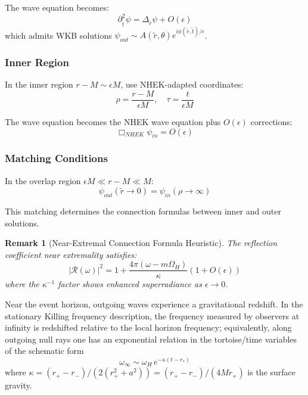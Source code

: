 \documentclass[12pt,a4paper]{article}
\newtheorem{remark}[theorem]{Remark}
\begin{document}
The wave equation becomes:
\begin{equation}
\partial_{\tilde{t}}^2 \psi = \Delta_{\tilde{r}}\psi + O(\epsilon)
\end{equation}
which admits WKB solutions $\psi_{out} \sim A(\tilde{r}, \theta)e^{i\phi(\tilde{r}, \tilde{t})/\epsilon}$.

\subsubsection{Inner Region}

In the inner region $r - M \sim \epsilon M$, use NHEK-adapted coordinates:
\begin{equation}
\rho = \frac{r - M}{\epsilon M}, \quad \tau = \frac{t}{\epsilon M}
\end{equation}

The wave equation becomes the NHEK wave equation plus $O(\epsilon)$ corrections:
\begin{equation}
\Box_{NHEK}\psi_{in} = O(\epsilon)
\end{equation}

\subsubsection{Matching Conditions}

In the overlap region $\epsilon M \ll r - M \ll M$:
\begin{equation}
\psi_{out}(\tilde{r} \to 0) = \psi_{in}(\rho \to \infty)
\end{equation}

This matching determines the connection formulas between inner and outer solutions.

\begin{remark}[Near-Extremal Connection Formula Heuristic]
The reflection coefficient near extremality satisfies:
\begin{equation}
|\mathcal{R}(\omega)|^2 = 1 + \frac{4\pi(\omega - m\Omega_H)}{\kappa}\left(1 + O(\epsilon)\right)
\end{equation}
where the $\kappa^{-1}$ factor shows enhanced superradiance as $\epsilon \to 0$.
\end{remark}

Near the event horizon, outgoing waves experience a gravitational redshift. In the stationary Killing frequency description, the frequency measured by observers at infinity is redshifted relative to the local horizon frequency; equivalently, along outgoing null rays one has an exponential relation in the tortoise/time variables of the schematic form
\begin{equation}
\omega_{\infty} \sim \omega_H \, e^{-\kappa (t-r_*)}
\end{equation}
where $\kappa = (r_+ - r_-)/(2(r_+^2+a^2)) = (r_+ - r_-)/(4Mr_+)$ is the surface gravity.
\end{document}
